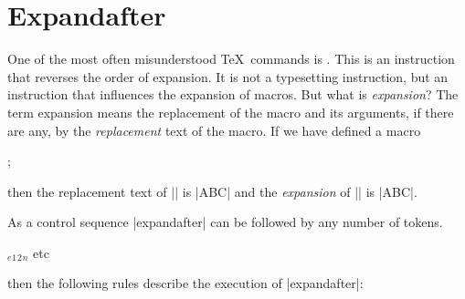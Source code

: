 \chapter{Expandafter}

One of the most often misunderstood \TeX\ commands is . This
is an instruction that reverses the order of expansion. It is not a typesetting instruction, but an instruction that influences the expansion of macros. But what is \textit{expansion}? The term expansion means the replacement of the macro and its arguments, if there are any, by the \textit{replacement} text of the macro. If we have defined a macro

\begin{teX}
\def\test{ABC};
\end{teX}


\noindent then the replacement text of |\test| is |ABC| and the \textit{expansion} of |\test| is |ABC|.

As a control sequence |expandafter| can be followed by any number of tokens.

\begin{commands}[]{}
\cmd{\expandafter}\string\token$_e$\string\token$_1$\string\token$_2$\string\token$_n$ etc
\end{commands}

\noindent then the following rules describe the execution of |expandafter|:


